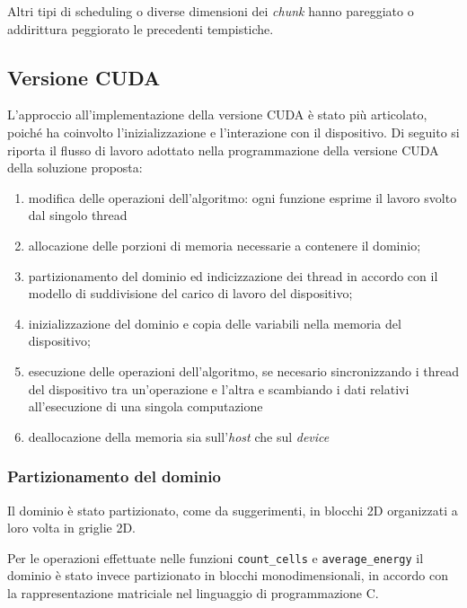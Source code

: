 Altri tipi di scheduling o diverse dimensioni dei \textit{chunk} hanno
pareggiato o addirittura peggiorato le precedenti tempistiche.


\subsection{Versione CUDA}

L'approccio all'implementazione della versione CUDA è stato più articolato,
poiché ha coinvolto l'inizializzazione e l'interazione con il dispositivo.
Di seguito si riporta il flusso di lavoro adottato nella programmazione della
versione CUDA della soluzione proposta:

\begin{enumerate}
    \item modifica delle operazioni dell'algoritmo: ogni funzione esprime il
        lavoro svolto dal singolo thread
    \item allocazione delle porzioni di memoria necessarie a contenere il
        dominio;
    \item partizionamento del dominio ed indicizzazione dei thread in accordo
        con il modello di suddivisione del carico di lavoro del dispositivo;
    \item inizializzazione del dominio e copia delle variabili nella memoria del
        dispositivo;
    \item esecuzione delle operazioni dell'algoritmo, se necesario
        sincronizzando i thread del dispositivo tra un'operazione e l'altra e
        scambiando i dati relativi all'esecuzione di una singola computazione
    \item deallocazione della memoria sia sull'\textit{host} che sul
        \textit{device}
\end{enumerate}

\subsubsection{Partizionamento del dominio}

Il dominio è stato partizionato, come da suggerimenti, in blocchi 2D organizzati
a loro volta in griglie 2D.

Per le operazioni effettuate nelle funzioni \texttt{count\_cells} e
\texttt{average\_energy} il dominio è stato invece partizionato in blocchi
monodimensionali, in accordo con la rappresentazione matriciale nel linguaggio
di programmazione C.

